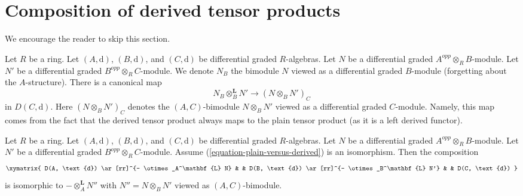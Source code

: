 \section{Composition of derived tensor products}
\label{section-compose-tensor-functors}

\noindent
We encourage the reader to skip this section.

\medskip\noindent
Let $R$ be a ring. Let $(A, \text{d})$, $(B, \text{d})$, and
$(C, \text{d})$ be differential graded $R$-algebras.
Let $N$ be a differential graded $A^{opp} \otimes_R B$-module.
Let $N'$ be a differential graded $B^{opp} \otimes_R C$-module.
We denote $N_B$ the bimodule $N$ viewed as a differential graded
$B$-module (forgetting about the $A$-structure). There is a canonical map
\begin{equation}
\label{equation-plain-versus-derived}
N_B \otimes_B^\mathbf{L} N'
\longrightarrow
(N \otimes_B N')_C
\end{equation}
in $D(C, \text{d})$. Here $(N \otimes_B N')_C$ denotes the
$(A, C)$-bimodule $N \otimes_B N'$ viewed as a
differential graded $C$-module. Namely, this map
comes from the fact that the derived tensor product always maps to the
plain tensor product (as it is a left derived functor).

\begin{lemma}
\label{lemma-compose-tensor-functors-general}
Let $R$ be a ring. Let $(A, \text{d})$, $(B, \text{d})$, and
$(C, \text{d})$ be differential graded $R$-algebras.
Let $N$ be a differential graded $A^{opp} \otimes_R B$-module.
Let $N'$ be a differential graded $B^{opp} \otimes_R C$-module.
Assume (\ref{equation-plain-versus-derived}) is an isomorphism.
Then the composition
$$
\xymatrix{
D(A, \text{d}) \ar[rr]^{- \otimes_A^\mathbf{L} N} & &
D(B, \text{d}) \ar[rr]^{- \otimes_B^\mathbf{L} N'} & &
D(C, \text{d})
}
$$
is isomorphic to $- \otimes_A^\mathbf{L} N''$ with
$N'' = N \otimes_B N'$ viewed as $(A, C)$-bimodule.
\end{lemma}

